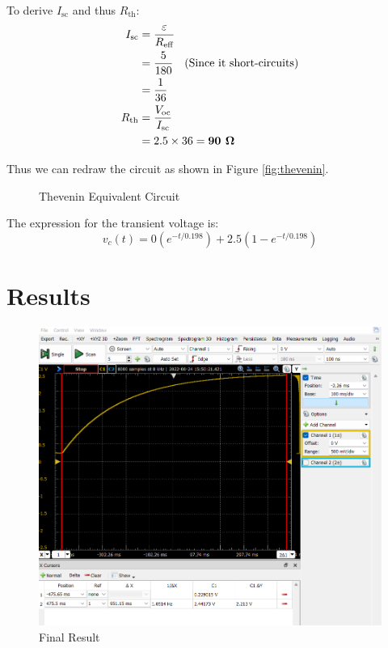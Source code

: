 \documentclass[a4paper,12pt,oneside, tikz]{book}
\begin{document}
To derive $I_\text{sc}$ and thus $R_\text{th}$:
\begin{align*}
    I_\text{sc} &= \frac{\varepsilon}{R_\text{eff}} \\
    &= \frac{5}{180} \text{\quad (Since it short-circuits)} \\
    &= \frac{1}{36} \\
    R_\text{th} &= \frac{V_\text{oc}}{I_\text{sc}} \\
    &= 2.5 \times 36 = \textbf{90 }\bf{\Omega}
\end{align*}

Thus we can redraw the circuit as shown in Figure \ref{fig:thevenin}.

\begin{figure}[H]
    \centering
    \caption{Thevenin Equivalent Circuit}
    \label{fig:theveninEq}

\end{figure}


The expression for the transient voltage is:
$$v_c(t) = 0(e^{-t/0.198}) + 2.5(1 - e^{-t/0.198})$$

\newpage
\section{Results}

\begin{figure}[ht]
    \centering
    \includegraphics[width=1\textwidth]{images/activity2result.png}
    \caption{Final Result}
    \label{fig:result}
\end{figure}
\end{document}

